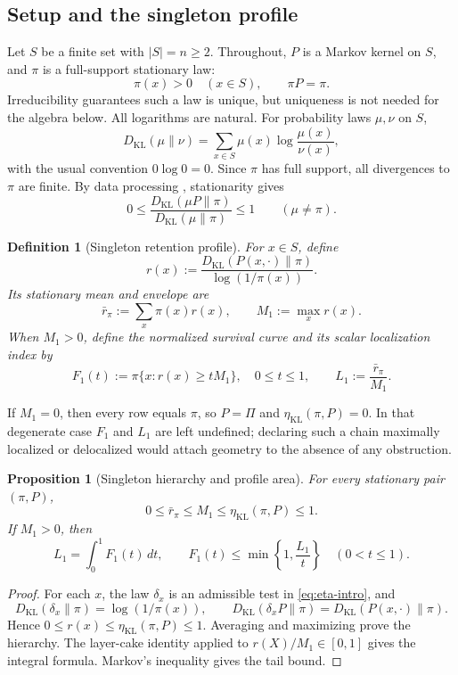 \documentclass[11pt]{article}
\newtheorem{proposition}[theorem]{Proposition}
\newtheorem{definition}[theorem]{Definition}
\newcommand{\KL}{D_{\mathrm{KL}}}
\newcommand{\etaStat}{\eta_{\mathrm{KL}}(\pi,P)}
\newcommand{\Mone}{M_1}
\newcommand{\Lone}{L_1}
\begin{document}
\subsection{Setup and the singleton profile}

Let \(S\) be a finite set with \(|S|=n\ge2\).  Throughout, \(P\) is a
Markov kernel on \(S\), and \(\pi\) is a full-support stationary law:
\[
  \pi(x)>0\quad(x\in S),\qquad \pi P=\pi.
\]
Irreducibility guarantees such a law is unique, but uniqueness is not
needed for the algebra below.  All logarithms are natural.  For probability
laws \(\mu,\nu\) on \(S\),
\[
  \KL(\mu\|\nu)
  =\sum_{x\in S}\mu(x)\log\frac{\mu(x)}{\nu(x)},
\]
with the usual convention \(0\log0=0\).  Since \(\pi\) has full support,
all divergences to \(\pi\) are finite.  By data processing
\cite{CoverThomas2006}, stationarity gives
\[
  0\le
  \frac{\KL(\mu P\|\pi)}{\KL(\mu\|\pi)}
  \le1
  \qquad(\mu\ne\pi).
\]

\begin{definition}[Singleton retention profile]
\label{def:singleton-profile}
For \(x\in S\), define
\[
  r(x)
  :=
  \frac{\KL(P(x,\cdot)\|\pi)}{\log(1/\pi(x))}.
\]
Its stationary mean and envelope are
\[
  \bar r_\pi:=\sum_x\pi(x)r(x),
  \qquad
  \Mone:=\max_x r(x).
\]
When \(\Mone>0\), define the normalized survival curve and its scalar
localization index by
\[
  F_1(t):=\pi\{x:r(x)\ge t\Mone\},
  \quad 0\le t\le1,
  \qquad
  \Lone:=\frac{\bar r_\pi}{\Mone}.
\]
\end{definition}

If \(\Mone=0\), then every row equals \(\pi\), so \(P=\Pi\) and
\(\etaStat=0\).  In that degenerate case \(F_1\) and \(\Lone\) are left
undefined; declaring such a chain maximally localized or delocalized would
attach geometry to the absence of any obstruction.

\begin{proposition}[Singleton hierarchy and profile area]
\label{prop:singleton-hierarchy}
For every stationary pair \((\pi,P)\),
\[
  0\le \bar r_\pi\le\Mone\le\etaStat\le1.
\]
If \(\Mone>0\), then
\[
  \Lone=\int_0^1F_1(t)\,dt,
  \qquad
  F_1(t)\le \min\!\left\{1,\frac{\Lone}{t}\right\}
  \quad(0<t\le1).
\]
\end{proposition}

\begin{proof}
For each \(x\), the law \(\delta_x\) is an admissible test in
\eqref{eq:eta-intro}, and
\[
  \KL(\delta_x\|\pi)=\log(1/\pi(x)),\qquad
  \KL(\delta_xP\|\pi)=\KL(P(x,\cdot)\|\pi).
\]
Hence \(0\le r(x)\le\etaStat\le1\).  Averaging and maximizing prove the
hierarchy.  The layer-cake identity applied to \(r(X)/\Mone\in[0,1]\)
gives the integral formula.  Markov's inequality gives the tail bound.
\end{proof}
\end{document}
